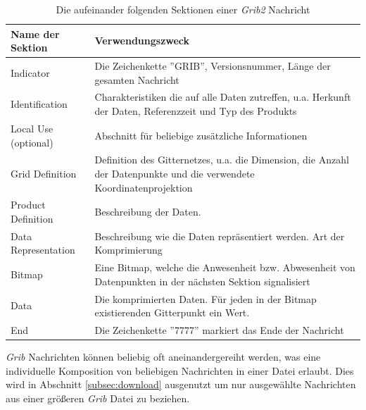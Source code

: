 \begin{table}
  \centering
  {\sf
    \footnotesize
    \begin{longtable}{@{}lp{10cm}@{}}

      \toprule
      \textbf{Name der Sektion} & \textbf{Verwendungszweck} \\

      \midrule

      Indicator & Die Zeichenkette ''GRIB'', Versionsnummer, Länge der gesamten Nachricht \\

      Identification & Charakteristiken die auf alle Daten zutreffen, u.a. Herkunft der Daten, Referenzzeit und Typ des Produkts \\

      Local Use (optional) & Abschnitt für beliebige zusätzliche Informationen \\

      Grid Definition &  Definition des Gitternetzes, u.a. die Dimension, die Anzahl der Datenpunkte und die verwendete Koordinatenprojektion \\

      Product Definition &  Beschreibung der Daten. \\

      Data Representation &  Beschreibung wie die Daten repräsentiert werden. Art der Komprimierung \\

      Bitmap & Eine Bitmap, welche die Anwesenheit bzw. Abwesenheit von Datenpunkten in der nächsten Sektion signalisiert \\

      Data &  Die komprimierten Daten. Für jeden in der Bitmap existierenden Gitterpunkt ein Wert. \\

      End & Die Zeichenkette ''7777'' markiert das Ende der Nachricht \\

      \bottomrule

    \end{longtable}
  }

  \caption{Die aufeinander folgenden Sektionen einer \textit{Grib2} Nachricht}
  \label{tab:grib}

\end{table}

\textit{Grib} Nachrichten können beliebig oft aneinandergereiht
werden, was eine individuelle Komposition von beliebigen Nachrichten
in einer Datei erlaubt. Dies wird in Abschnitt \ref{subsec:download}
ausgenutzt um nur ausgewählte Nachrichten aus einer größeren
\textit{Grib} Datei zu beziehen.

